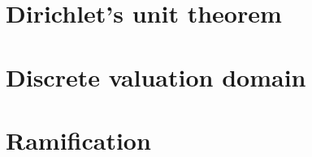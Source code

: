 \documentclass[a4paper,10pt]{article}
\begin{document}
\section{Dirichlet's unit theorem}

\newpage

\section{Discrete valuation domain}

\newpage

\section{Ramification}

\newpage

\begin{thebibliography}{}



\end{thebibliography}

\printindex
\newpage
\end{document}

